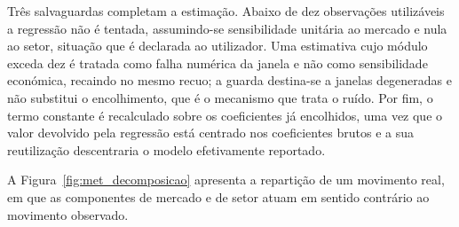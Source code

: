 Três salvaguardas completam a estimação. Abaixo de dez observações utilizáveis a regressão não é
tentada, assumindo-se sensibilidade unitária ao mercado e nula ao setor, situação que é declarada
ao utilizador. Uma estimativa cujo módulo exceda dez é tratada como falha numérica da janela e não
como sensibilidade económica, recaindo no mesmo recuo; a guarda destina-se a janelas degeneradas e
não substitui o encolhimento, que é o mecanismo que trata o ruído. Por fim, o termo constante é
recalculado sobre os coeficientes já encolhidos, uma vez que o valor devolvido pela regressão está
centrado nos coeficientes brutos e a sua reutilização descentraria o modelo efetivamente reportado.

A Figura~\ref{fig:met_decomposicao} apresenta a repartição de um movimento real, em que as
componentes de mercado e de setor atuam em sentido contrário ao movimento observado.


